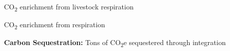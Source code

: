   \item CO\textsubscript{2} enrichment from livestock respiration
  \item CO\textsubscript{2} enrichment from respiration
  \item \textbf{Carbon Sequestration:} Tons of CO\textsubscript{2}e sequestered through integration 